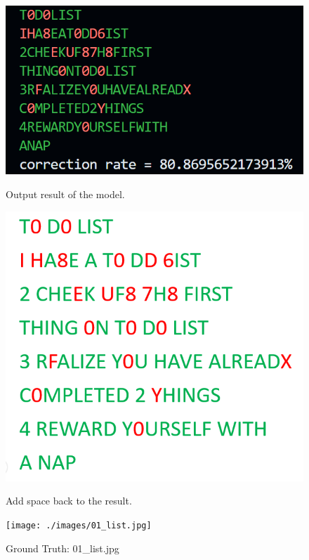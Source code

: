 \documentclass{article}
\begin{document}
\captionsetup{font=scriptsize} 		
\begin{figure}[H]
	\centering
	\begin{minipage}{0.33\linewidth}
		\centering
		\includegraphics[width=\linewidth]{./Q44_res1.png}
		\caption{Output result of the model.}
		\label{fig:Q44_res1}
	\end{minipage}%
	\hfill
	\begin{minipage}{0.33\linewidth}
		\centering
		\includegraphics[width=\linewidth, height=0.56\columnwidth]{./Q44_add_space1.png}
		\caption{Add space back to the result.}
		\label{fig:Q44_add_space1}
	\end{minipage}%
	\hfill
	\begin{minipage}{0.33\linewidth}
		\centering
		\texttt{[image: ./images/01\_list.jpg]}
		\caption{Ground Truth: 01\_list.jpg}
		\label{fig:Q44_res1_gt}
	\end{minipage}
\end{figure}
\end{document}
